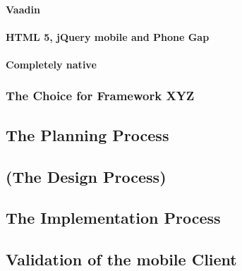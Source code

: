 \paragraph{Vaadin}
\paragraph{HTML 5, jQuery mobile and Phone Gap}
\paragraph{Completely native}
\subsubsection{The Choice for Framework XYZ}
\subsection{The Planning Process}
\subsection{(The Design Process)}
\subsection{The Implementation Process}
\subsection{Validation of the mobile Client}

